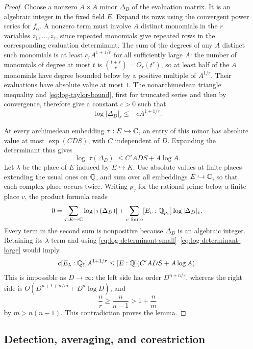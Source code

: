 \begin{proof}
Choose a nonzero $A\times A$ minor $\Delta_D$ of the evaluation
matrix.  It is an algebraic integer in the fixed field $E$.
Expand its rows using the convergent power series for $f_\alpha$.
A nonzero term must involve $A$ distinct monomials in the $r$
variables $z_1,\ldots,z_r$, since repeated monomials give repeated
rows in the corresponding evaluation determinant.  The sum of the
degrees of any $A$ distinct such monomials is at least
$c_rA^{1+1/r}$ for all sufficiently large $A$: the number of
monomials of degree at most $t$ is $\binom{t+r}{r}=O_r(t^r)$,
so at least half of the $A$ monomials have degree bounded below by
a positive multiple of $A^{1/r}$.  Their evaluations have absolute
value at most $1$.  The nonarchimedean triangle inequality and
\eqref{eq:log-taylor-bound}, first for truncated series and then by
convergence, therefore give a constant $c>0$ such that
\begin{equation}\label{eq:log-determinant-small}
 \log|\Delta_D|_\ell\leq-cA^{1+1/r}.
\end{equation}

At every archimedean embedding $\tau:E\hookrightarrow\mathbb C$, an
entry of this minor has absolute value at most $\exp(CDS)$, with
$C$ independent of $D$.  Expanding the determinant thus gives
\begin{equation}\label{eq:log-determinant-large}
 \log|\tau(\Delta_D)|\leq C'ADS+A\log A.
\end{equation}
Let $\lambda$ be the place of $E$ induced by $E\hookrightarrow K$.
Use absolute values at finite places extending the usual ones on
$\mathbb Q$, and sum over all embeddings $E\hookrightarrow\mathbb C$, so that
each complex place occurs twice.  Writing $p_v$ for the rational
prime below a finite place $v$, the product formula reads
\[
 0=\sum_{\tau:E\hookrightarrow\mathbb C}\log|\tau(\Delta_D)|
     +\sum_{v\text{ finite}}[E_v:\mathbb Q_{p_v}]
                            \log|\Delta_D|_v.
\]
Every term in the second sum is nonpositive because $\Delta_D$ is
an algebraic integer.  Retaining its $\lambda$-term and using
\eqref{eq:log-determinant-small}--\eqref{eq:log-determinant-large}
would imply
\[
 c[E_\lambda:\mathbb Q_\ell]A^{1+1/r}
 \leq [E:\mathbb Q](C'ADS+A\log A).
\]
This is impossible as $D\to\infty$: the left side has order
$D^{n+n/r}$, whereas the right side is
$O(D^{n+1+n/m}+D^n\log D)$, and
\[
 \frac nr\geq\frac n{n-1}>1+\frac nm
\]
by $m>n(n-1)$.  This contradiction proves the lemma.
\end{proof}

\subsection{Detection, averaging, and corestriction}


